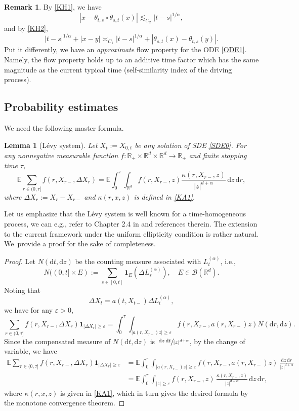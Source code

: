 \documentclass[11pt]{article}
\newcommand{\ie}{i.e.,\xspace}
\newcommand{\eg}{e.g.,\xspace}
\numberwithin{equation}{section}\providecommand{\asymp}{\mathrel{\sim}}
\newcommand{\rd}{\mathrm{d}}
\theoremstyle{plain}
\newtheorem{lemma}[theorem]{Lemma}
\theoremstyle{definition}
\newtheorem{remark}[theorem]{Remark}
\let\eps\varepsilon
\newcommand\mE{\mathbb{E}}
\newcommand\mR{\mathbb{R}}
\newcommand\1{{\mathbf{1}}}
\newcommand\sB{{\mathscr B}}
\newcommand{\dif}{\,\mathrm{d}}
\begin{document}
\begin{remark}
By \eqref{KH1}, we have
\begin{equation*}%
|x-\theta_{t,s}\circ\theta_{s,t}(x)|\lesssim_{C_2} |t-s|^{1/\alpha},
\end{equation*}
and by \eqref{KH2},
\begin{equation}\label{KH22}
|t-s|^{1/\alpha}+|x-y|\asymp_{C_1}|t-s|^{1/\alpha}+|\theta_{s,t}(x)-\theta_{t,s}(y)|.
\end{equation}
Put it differently, we have an \textit{approximate} flow property for the ODE \eqref{ODE1}. Namely, the flow property holds up to an additive time factor which has the same magnitude as the current typical time (self-similarity index of the driving process).
\end{remark}
\subsection{Probability estimates}

We need the following master formula.
\begin{lemma}[Lévy system]\label{Le24}
Let $X_t:=X_{0,t}$ be any solution of SDE \eqref{SDE0}.
For any nonnegative measurable function $f: \mR_+\times\mR^d\times\mR^d\to\mR_+$ and finite stopping time $\tau$,
\[
\mE\sum_{r\in(0,\tau]}f(r, X_{r-}, \Delta X_r)=\mE\int^\tau_0\!\!\!\int_{\mR^d}f(r, X_{r-}, z)\frac{\kappa(r,X_{r-},z)}{|z|^{d+\alpha}}\dif z\dif r,
\]
where $\Delta X_r:=X_r-X_{r-}$ and $\kappa(r,x,z)$ is defined in \eqref{KA1}.
\end{lemma}
Let us emphasize that the Lévy system is well known for a time-homogeneous process, we can \eg refer to Chapter 2.4 in \cite{bott:schi:wang:13} and references therein. The extension to the current framework under the uniform ellipticity condition is rather natural. We~provide a proof for the sake of completeness.
\begin{proof}
Let $N(\rd t,\rd z)$ be the counting measure associated with $L^{(\alpha)}_t$, \ie
\[
N((0,t]\times E):=\sum_{s\in[0,t]}\1_E(\Delta L^{(\alpha)}_s),\quad E\in\sB(\mR^d).
\]
Noting that
\[
\Delta X_t=a(t,X_{t-})\Delta L^{(\alpha)}_t,
\]
we have for any $\eps>0$,
\[
\sum_{r\in(0,\tau]}f(r, X_{r-}, \Delta X_r)
\1_{|\Delta X_r|\geq\eps}
=\int^\tau_0\!\!\!
\int_{|{a(r,X_{r-})z}|\geq\eps}
f(r, X_{r-}, a(r,X_{r-})z)
N(\rd r,\rd z).
\]
Since the compensated measure of $N(\rd t,\rd z)$ is $\sfrac{\dif z\dif t}{|z|^{d+\alpha}}$,
by the change of variable, we have
\begin{align*}
\mE\sum_{r\in(0,\tau]}f(r, X_{r-}, \Delta X_r)
\1_{|\Delta X_r|\geq\eps}
&=\mE\int^\tau_0\!\!\!
\int_{|{a(r,X_{r-})z}|\geq\eps}
f(r, X_{r-}, a(r,X_{r-})z)\,\frac{\rd z\dif r}{|z|^{d+\alpha}}
\\&=\mE\int^\tau_0\!\!\!\int_{|z|\geq\eps}f(r, X_{r-}, z)\,\frac{\kappa(r,X_{r-},z)}{|z|^{d+\alpha}}\dif z\dif r,
\end{align*}
where $\kappa(r,x,z)$ is given in \eqref{KA1},
which in turn gives the desired formula by the monotone convergence theorem.
\end{proof}
\end{document}
